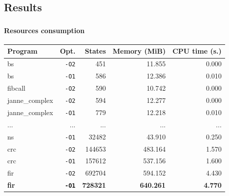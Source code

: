 \documentclass[usenames,dvipsnames]{beamer}
\begin{document}
  \subsection{Results}
  \begin{frame}
    \frametitle{\subsecname}
    \framesubtitle{Resources consumption}
    \small

    \begin{table}
      \scriptsize
      \centering
      \begin{tabular}{|l||r|r|r|r|}
                                                                              \hline
        Program & Opt. & States & Memory (MiB) & CPU time (s.) \tabularnewline\hline
                                                                              \hline
        bs               & {\tt -O2}  &    451 &  11.855 & 0.000   \tabularnewline\hline
        bs               & {\tt -O1}  &    586 &  12.386 & 0.010   \tabularnewline\hline
        fibcall          & {\tt -O2}  &    590 &  10.742 & 0.000   \tabularnewline\hline
        janne\_complex   & {\tt -O2}  &    594 &  12.277 & 0.000   \tabularnewline\hline
        janne\_complex   & {\tt -O1}  &    779 &  12.218 & 0.010   \tabularnewline\hline
                                                                            \hline
        ...              & ...  &    ... &     ... &   ...   \tabularnewline\hline
                                                                            \hline
        ns               & {\tt -O1}  &  32482 &  43.910 & 0.250   \tabularnewline\hline
        crc              & {\tt -O2}  & 144653 & 483.164 & 1.570   \tabularnewline\hline
        crc              & {\tt -O1}  & 157612 & 537.156 & 1.600   \tabularnewline\hline
        fir              & {\tt -O2}  & 692704 & 594.152 & 4.430   \tabularnewline\hline
        {\bf fir} & {\bf\texttt{-O1}}  & {\bf 728321} & {\bf 640.261} & {\bf 4.770}   \tabularnewline\hline
      \end{tabular}
    \end{table}


\end{frame}
\end{document}

